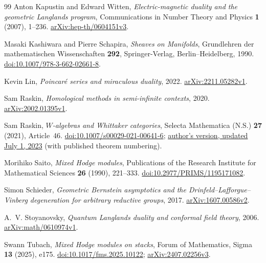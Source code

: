 \documentclass[11pt]{article}
\numberwithin{equation}{section}
\theoremstyle{definition}
\theoremstyle{remark}
\begin{document}
\begin{thebibliography}{99}
Anton Kapustin and Edward Witten,
\emph{Electric-magnetic duality and the geometric Langlands program},
Communications in Number Theory and Physics \textbf{1} (2007), 1--236.
\href{https://arxiv.org/abs/hep-th/0604151v3}{arXiv:hep-th/0604151v3}.

Masaki Kashiwara and Pierre Schapira,
\emph{Sheaves on Manifolds}, Grundlehren der mathematischen Wissenschaften
\textbf{292}, Springer-Verlag, Berlin--Heidelberg, 1990.
\href{https://doi.org/10.1007/978-3-662-02661-8}{doi:10.1007/978-3-662-02661-8}.

Kevin Lin,
\emph{Poincar\'e series and miraculous duality}, 2022.
\href{https://arxiv.org/abs/2211.05282v1}{arXiv:2211.05282v1}.

Sam Raskin,
\emph{Homological methods in semi-infinite contexts}, 2020.
\href{https://arxiv.org/abs/2002.01395v1}{arXiv:2002.01395v1}.

Sam Raskin,
\emph{$W$-algebras and Whittaker categories},
Selecta Mathematica (N.S.) \textbf{27} (2021), Article~46.
\href{https://doi.org/10.1007/s00029-021-00641-6}{doi:10.1007/s00029-021-00641-6};
\href{https://www.samraskin.net/whit.pdf}{author's version, updated July 1, 2023}
(with published theorem numbering).

Morihiko Saito,
\emph{Mixed Hodge modules},
Publications of the Research Institute for Mathematical Sciences
\textbf{26} (1990), 221--333.
\href{https://doi.org/10.2977/PRIMS/1195171082}{doi:10.2977/PRIMS/1195171082}.

Simon Schieder,
\emph{Geometric Bernstein asymptotics and the Drinfeld--Lafforgue--Vinberg
degeneration for arbitrary reductive groups}, 2017.
\href{https://arxiv.org/abs/1607.00586v2}{arXiv:1607.00586v2}.

A.~V. Stoyanovsky,
\emph{Quantum Langlands duality and conformal field theory}, 2006.
\href{https://arxiv.org/abs/math/0610974v1}{arXiv:math/0610974v1}.

Swann Tubach,
\emph{Mixed Hodge modules on stacks},
Forum of Mathematics, Sigma \textbf{13} (2025), e175.
\href{https://doi.org/10.1017/fms.2025.10122}{doi:10.1017/fms.2025.10122};
\href{https://arxiv.org/abs/2407.02256v3}{arXiv:2407.02256v3}.

\end{thebibliography}
\end{document}
